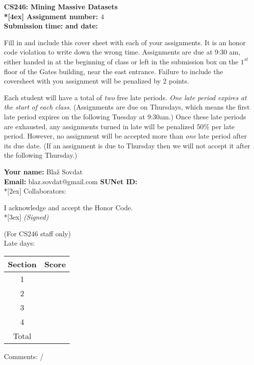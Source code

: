 \begin{titlepage}
	\thispagestyle{empty}
	\parindent 0pt
	\vfill

	\begin{center}
	\LARGE{\bf \textsf{CS246: Mining Massive Datasets} \\*[4ex]
	\Large{
	Assignment number: $4$\hrulefill \\
	Submission time: \hrulefill \quad and date: \hrulefill } }
	\end{center}

	\vfill

	Fill in and include this cover sheet with each of your assignments. It is an honor code violation to write down the wrong time. Assignments are due at 9:30 am, either handed in at the beginning of class or left in the submission box on the $1^{st}$ floor of the Gates building, near the east entrance. Failure to include the coversheet with you assignment will be penalized by 2 points.

	Each student will have a total of {\em two} free late periods. {\em One late period expires at the start of each class.} (Assignments are due on Thursdays, which means the first late period expires on the following Tuesday at 9:30am.) Once these late periods are exhausted, any assignments turned in late will be penalized 50\% per late period. However, no assignment will be accepted more than {\em one} late period after its due date. (If an assignment is due to Thursday then we will not accept it after the following Thursday.) 

	\vfill
	\bigskip
	\vfill

	{\Large
	\textbf{Your name:} Bla\v{z} Sovdat\hrulefill \\
	\textbf{Email:} blaz.sovdat@gmail.com\underline{\hspace*{7cm}} \textbf{SUNet ID:} \hrulefill\\*[2ex] }
	Collaborators:\hrulefill
	\vfill

	I acknowledge and accept the Honor Code.\\*[3ex]
	\bigskip
	\textit{(Signed)}\hrulefill

	\vfill
	\vfill

	\begin{center}
	\normalsize{(For CS246 staff only)\\
	\bigskip
	Late days:  }
	\end{center}


	\begin{center}
	\linespread{1.3}
	\large
	\begin{tabular}{|c|r|}\hline
	Section & \hspace*{1.5cm} Score \\ \hline \hline
	1 &  \\ \hline
	2 &  \\ \hline
	3 &  \\ \hline
	4 &  \\ \hline
	\hline
	Total & \hspace*{1cm} \\ \hline
	\end{tabular}
	\end{center}
	Comments: /
\end{titlepage}
